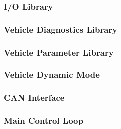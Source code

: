 \subsubsection{I/O Library}


\subsubsection{Vehicle Diagnostics Library}


\subsubsection{Vehicle Parameter Library}


\subsubsection{Vehicle Dynamic Mode}


\subsubsection{CAN Interface}


\subsubsection{Main Control Loop}